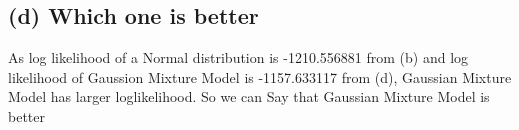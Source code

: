 \documentclass[11pt]{article}
\begin{document}
    \subsection{(d) Which one is better}\label{d-which-one-is-better}

    As log likelihood of a Normal distribution is -1210.556881 from (b) and
log likelihood of Gaussion Mixture Model is -1157.633117 from (d),
Gaussian Mixture Model has larger loglikelihood. So we can Say that
Gaussian Mixture Model is better


    
    
    
    
\end{document}
